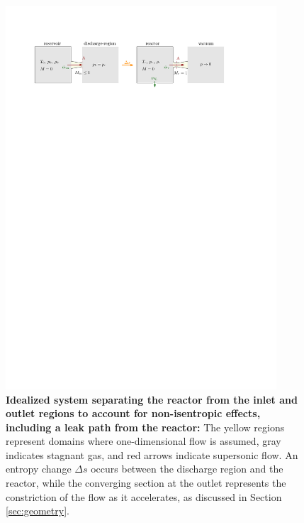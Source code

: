 	\begin{figure}[H]
	    \centering
	    \includegraphics[width=0.9\textwidth]{src/03_analytical-work/fig_disconnected-reservoirs-with-leak.pdf}
	    \caption[Idealized system separating the reactor from the inlet and outlet regions to account for non-isentropic effects, now including a leak path from the reactor.]{
	        \textbf{Idealized system separating the reactor from the inlet and outlet regions to account for non-isentropic effects, including a leak path from the reactor:}
	        The yellow regions represent domains where one-dimensional flow is assumed, gray indicates stagnant gas, and red arrows indicate supersonic flow.
	        An entropy change $\Delta s$ occurs between the discharge region and the reactor, while the converging section at the outlet represents the constriction of the flow as it accelerates, as discussed in Section \ref{sec:geometry}.
	    }
	    \label{fig:disconnected-reservoirs-leak}
	\end{figure}

